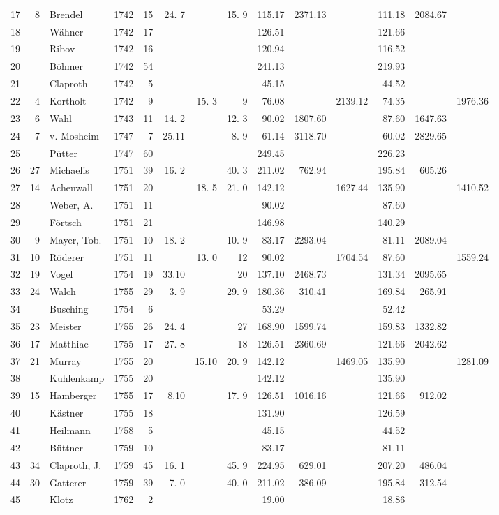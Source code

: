 \begin{center}
\begin{tabular}{|r|r|l|r|r|r|r|r|r|r|r|r|r|r|}
17&8&Brendel&1742&15&24. 7&&15. 9&115.17&2371.13&&111.18&2084.67&\\
18&&Wähner&1742&17&&&&126.51&&&121.66&&\\
19&&Ribov&1742&16&&&&120.94&&&116.52&&\\
20&&Böhmer&1742&54&&&&241.13&&&219.93&&\\[3pt]
21&&Claproth&1742&5&&&&45.15&&&44.52&&\\
22&4&Kortholt&1742&9&&15. 3&9&76.08&&2139.12&74.35&&1976.36\\
23&6&Wahl&1743&11&14. 2&&12. 3&90.02&1807.60&&87.60&1647.63&\\
24&7&v. Mosheim&1747&7&25.11&&8. 9&61.14&3118.70&&60.02&2829.65&\\
25&&Pütter&1747&60&&&&249.45&&&226.23&&\\
26&27&Michaelis&1751&39&16. 2&&40. 3&211.02&762.94&&195.84&605.26&\\
27&14&Achenwall&1751&20&&18. 5&21. 0&142.12&&1627.44&135.90&&1410.52\\
28&&Weber, A.&1751&11&&&&90.02&&&87.60&&\\
29&&Förtsch&1751&21&&&&146.98&&&140.29&&\\
30&9&Mayer, Tob.&1751&10&18. 2&&10. 9&83.17&2293.04&&81.11&2089.04&\\[3pt]
31&10&Röderer&1751&11&&13. 0&12&90.02&&1704.54&87.60&&1559.24\\
32&19&Vogel&1754&19&33.10&&20&137.10&2468.73&&131.34&2095.65&\\
33&24&Walch&1755&29&3. 9&&29. 9&180.36&310.41&&169.84&265.91&\\
34&&Busching&1754&6&&&&53.29&&&52.42&&\\
35&23&Meister&1755&26&24. 4&&27&168.90&1599.74&&159.83&1332.82&\\
36&17&Matthiae&1755&17&27. 8&&18&126.51&2360.69&&121.66&2042.62&\\
37&21&Murray&1755&20&&15.10&20. 9&142.12&&1469.05&135.90&&1281.09\\
38&&Kuhlenkamp&1755&20&&&&142.12&&&135.90&&\\
39&15&Hamberger&1755&17&8.10&&17. 9&126.51&1016.16&&121.66&912.02&\\
40&&Kästner&1755&18&&&&131.90&&&126.59&&\\[3pt]
41&&Heilmann&1758&5&&&&45.15&&&44.52&&\\
42&&Büttner&1759&10&&&&83.17&&&81.11&&\\
43&34&Claproth, J.&1759&45&16. 1&&45. 9&224.95&629.01&&207.20&486.04&\\
44&30&Gatterer&1759&39&7. 0&&40. 0&211.02&386.09&&195.84&312.54&\\
45&&Klotz&1762&2&&&&19.00&&&18.86&&\\\hline
\end{tabular}
\end{center}
